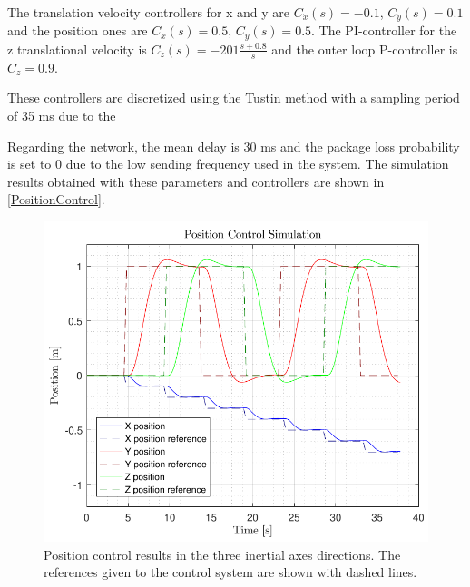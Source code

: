 The translation velocity controllers for x and y are $C_{\dot{x}}(s)= -0.1$, $C_{\dot{y}}(s)= 0.1$ and the position ones are $C_x(s)= 0.5$, $C_y(s)= 0.5$. The PI-controller for the z translational velocity is $C_{\dot{z}}(s)=-201\frac{s+0.8}{s}$ and the outer loop P-controller is $C_z=0.9$.

These controllers are discretized using the Tustin method with a sampling period of 35 ms due to the 

Regarding the network, the mean delay is 30 ms and the package loss probability is set to 0 due to the low sending frequency used in the system.
The simulation results obtained with these parameters and controllers are shown in \autoref{PositionControl}.
\begin{figure}[H]
	\centering
	\includegraphics[scale=0.5]{figures/PositionControl}
	\caption{Position control results in the three inertial axes directions. The references given to the control system are shown with dashed lines.}
	\label{PositionControl}
\end{figure}

